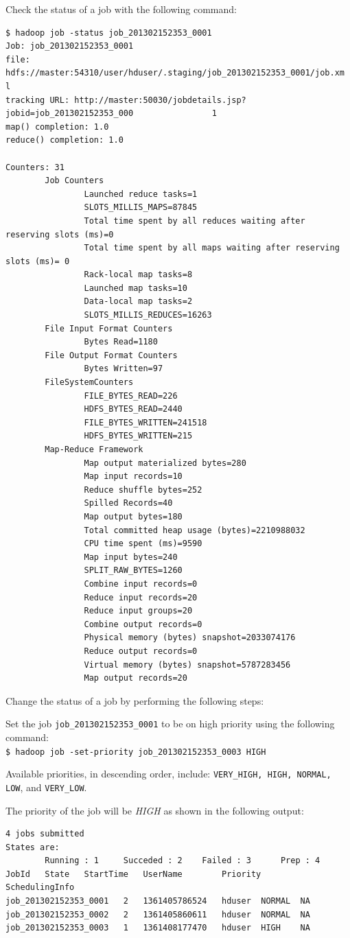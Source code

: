 Check the status of a job with the following command:
\lstset{style=bashstyle}
\begin{lstlisting}
$ hadoop job -status job_201302152353_0001
Job: job_201302152353_0001
file: hdfs://master:54310/user/hduser/.staging/job_201302152353_0001/job.xm                l
tracking URL: http://master:50030/jobdetails.jsp?jobid=job_201302152353_000                1
map() completion: 1.0
reduce() completion: 1.0

Counters: 31
        Job Counters
                Launched reduce tasks=1
                SLOTS_MILLIS_MAPS=87845
                Total time spent by all reduces waiting after reserving slots (ms)=0
                Total time spent by all maps waiting after reserving slots (ms)= 0
                Rack-local map tasks=8
                Launched map tasks=10
                Data-local map tasks=2
                SLOTS_MILLIS_REDUCES=16263
        File Input Format Counters
                Bytes Read=1180
        File Output Format Counters
                Bytes Written=97
        FileSystemCounters
                FILE_BYTES_READ=226
                HDFS_BYTES_READ=2440
                FILE_BYTES_WRITTEN=241518
                HDFS_BYTES_WRITTEN=215
        Map-Reduce Framework
                Map output materialized bytes=280
                Map input records=10
                Reduce shuffle bytes=252
                Spilled Records=40
                Map output bytes=180
                Total committed heap usage (bytes)=2210988032
                CPU time spent (ms)=9590
                Map input bytes=240
                SPLIT_RAW_BYTES=1260
                Combine input records=0
                Reduce input records=20
                Reduce input groups=20
                Combine output records=0
                Physical memory (bytes) snapshot=2033074176
                Reduce output records=0
                Virtual memory (bytes) snapshot=5787283456
                Map output records=20
\end{lstlisting}

Change the status of a job by performing the following steps:  

Set the job \verb|job_201302152353_0001| to be on high priority using the following command: \\
\verb|$ hadoop job -set-priority job_201302152353_0003 HIGH|

Available priorities, in descending order, include: \verb|VERY_HIGH, HIGH, NORMAL, LOW|, and \verb|VERY_LOW|.

The priority of the job will be \emph{HIGH} as shown in the following output:
\lstset{style=bashstyle}
\begin{lstlisting}
4 jobs submitted
States are:
        Running : 1     Succeded : 2    Failed : 3      Prep : 4
JobId   State   StartTime   UserName        Priority        SchedulingInfo
job_201302152353_0001   2   1361405786524   hduser  NORMAL  NA
job_201302152353_0002   2   1361405860611   hduser  NORMAL  NA
job_201302152353_0003   1   1361408177470   hduser  HIGH    NA
\end{lstlisting}


